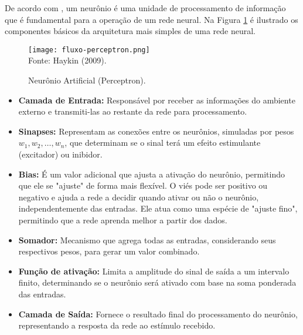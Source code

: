     De acordo com , um neurônio é uma unidade de processamento de informação que é fundamental para a operação de um
    rede neural. Na Figura \ref{fig:fluxo-perceptron} é ilustrado os componentes básicos da arquitetura mais simples de uma rede neural.
    \begin{figure}[!htb]
        \centering
        \caption{Neurônio Artificial (Perceptron).}
        \texttt{[image: fluxo-perceptron.png]}\\
        {\footnotesize Fonte: Haykin (2009).}\
        \label{fig:fluxo-perceptron}
    \end{figure}
    
    \begin{itemize}
        \item \textbf{Camada de Entrada: }Responsável por receber as informações do ambiente 
        externo e transmiti-las ao restante da rede para processamento.
        \item \textbf{Sinapses: }Representam as conexões entre os neurônios, simuladas por pesos 
        \( w_1, w_2, \dots, w_n \), que determinam se o sinal terá um efeito estimulante (excitador) ou 
        inibidor.
        \item \textbf{Bias: }É um valor adicional que ajusta a ativação do neurônio, permitindo que ele 
        se "ajuste" de forma mais flexível. O viés pode ser positivo ou negativo e ajuda a rede a decidir 
        quando ativar ou não o neurônio, independentemente das entradas. Ele atua como uma espécie de 
        "ajuste fino", permitindo que a rede aprenda melhor a partir dos dados.
        \item \textbf{Somador: }Mecanismo que agrega todas as entradas, considerando seus respectivos 
        pesos, para gerar um valor combinado.
        \item \textbf{Função de ativação: }Limita a amplitude do sinal de saída a um intervalo finito, 
        determinando se o neurônio será ativado com base na soma ponderada das entradas.
        \item \textbf{Camada de Saída: }Fornece o resultado final do processamento do neurônio, 
        representando a resposta da rede ao estímulo recebido.
    
    \end{itemize}


